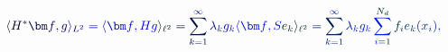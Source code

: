 \documentclass[12pt]{article}
\begin{document}
\makeatletter
\renewcommand*{\@textcolor}[3]{%
  \protect\leavevmode
  \begingroup
    \color#1{#2}#3%
  \endgroup
}
\makeatother
\begin{displaymath}
\mathcolor[RGB]{0,0,15}{\langle} \mathcolor[RGB]{0,0,30}{H} ^ { \mathcolor[RGB]{0,0,45}{*} } \mathcolor[RGB]{0,0,60}{\bm} { \mathcolor[RGB]{0,0,75}{f} } \mathcolor[RGB]{0,0,90}{,} \mathcolor[RGB]{0,0,105}{g} \mathcolor[RGB]{0,0,120}{\rangle} _ { \mathcolor[RGB]{0,0,135}{L} ^ { \mathcolor[RGB]{0,0,150}{2} } } \mathcolor[RGB]{0,0,165}{=} \mathcolor[RGB]{0,0,180}{\langle} \mathcolor[RGB]{0,0,195}{\bm} { \mathcolor[RGB]{0,0,210}{f} } \mathcolor[RGB]{0,0,225}{,} \mathcolor[RGB]{0,0,240}{H} \mathcolor[RGB]{0,0,255}{g} \mathcolor[RGB]{0,15,0}{\rangle} _ { \mathcolor[RGB]{0,15,15}{\ell} ^ { \mathcolor[RGB]{0,15,30}{2} } } \mathcolor[RGB]{0,15,45}{=} \mathcolor[RGB]{0,15,60}{\sum} _ { \mathcolor[RGB]{0,15,75}{k} \mathcolor[RGB]{0,15,90}{=} \mathcolor[RGB]{0,15,105}{1} } ^ { \mathcolor[RGB]{0,15,120}{\infty} } \mathcolor[RGB]{0,15,135}{\lambda} _ { \mathcolor[RGB]{0,15,150}{k} } \mathcolor[RGB]{0,15,165}{g} _ { \mathcolor[RGB]{0,15,180}{k} } \mathcolor[RGB]{0,15,195}{\langle} \mathcolor[RGB]{0,15,210}{\bm} { \mathcolor[RGB]{0,15,225}{f} } \mathcolor[RGB]{0,15,240}{,} \mathcolor[RGB]{0,15,255}{S} \mathcolor[RGB]{0,30,0}{e} _ { \mathcolor[RGB]{0,30,15}{k} } \mathcolor[RGB]{0,30,30}{\rangle} _ { \mathcolor[RGB]{0,30,45}{\ell} ^ { \mathcolor[RGB]{0,30,60}{2} } } \mathcolor[RGB]{0,30,75}{=} \mathcolor[RGB]{0,30,90}{\sum} _ { \mathcolor[RGB]{0,30,105}{k} \mathcolor[RGB]{0,30,120}{=} \mathcolor[RGB]{0,30,135}{1} } ^ { \mathcolor[RGB]{0,30,150}{\infty} } \mathcolor[RGB]{0,30,165}{\lambda} _ { \mathcolor[RGB]{0,30,180}{k} } \mathcolor[RGB]{0,30,195}{g} _ { \mathcolor[RGB]{0,30,210}{k} } \mathcolor[RGB]{0,30,225}{\sum} _ { \mathcolor[RGB]{0,30,240}{i} \mathcolor[RGB]{0,30,255}{=} \mathcolor[RGB]{0,45,0}{1} } ^ { \mathcolor[RGB]{0,45,15}{N} _ { \mathcolor[RGB]{0,45,30}{d} } } \mathcolor[RGB]{0,45,45}{f} _ { \mathcolor[RGB]{0,45,60}{i} } \mathcolor[RGB]{0,45,75}{e} _ { \mathcolor[RGB]{0,45,90}{k} } \mathcolor[RGB]{0,45,105}{(} \mathcolor[RGB]{0,45,120}{x} _ { \mathcolor[RGB]{0,45,135}{i} } \mathcolor[RGB]{0,45,150}{)} \mathcolor[RGB]{0,45,165}{,}
\end{displaymath}
\end{document}
